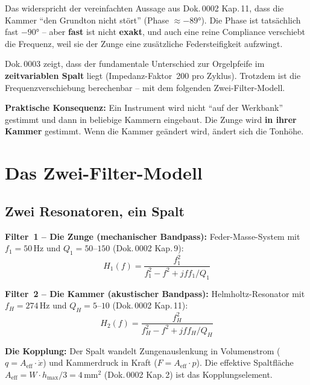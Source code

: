 \documentclass[11pt,a4paper]{article}
\begin{document}
Das widerspricht der vereinfachten Aussage aus Dok.\,0002 Kap.\,11, dass die Kammer ``den Grundton nicht stört'' (Phase $\approx -89$°). Die Phase ist tatsächlich fast $-90$° -- aber \textbf{fast} ist nicht \textbf{exakt}, und auch eine reine Compliance verschiebt die Frequenz, weil sie der Zunge eine zusätzliche Federsteifigkeit aufzwingt.

Dok.\,0003 zeigt, dass der fundamentale Unterschied zur Orgelpfeife im \textbf{zeitvariablen Spalt} liegt (Impedanz-Faktor~200 pro Zyklus). Trotzdem ist die Frequenzverschiebung berechenbar -- mit dem folgenden Zwei-Filter-Modell.

\begin{warnbox}
\textbf{Praktische Konsequenz:} Ein Instrument wird nicht ``auf der Werkbank'' gestimmt und dann in beliebige Kammern eingebaut. Die Zunge wird \textbf{in ihrer Kammer} gestimmt. Wenn die Kammer geändert wird, ändert sich die Tonhöhe.
\end{warnbox}

\section{Das Zwei-Filter-Modell}

\subsection{Zwei Resonatoren, ein Spalt}

\textbf{Filter~1 -- Die Zunge (mechanischer Bandpass):} Feder-Masse-System mit $f_1 = 50$\,Hz und $Q_1 = 50$--$150$ (Dok.\,0002 Kap.\,9):
\begin{equation}
H_1(f) = \frac{f_1^2}{f_1^2 - f^2 + j f f_1 / Q_1}
\end{equation}

\textbf{Filter~2 -- Die Kammer (akustischer Bandpass):} Helmholtz-Resonator mit $f_H = 274$\,Hz und $Q_H = 5$--$10$ (Dok.\,0002 Kap.\,11):
\begin{equation}
H_2(f) = \frac{f_H^2}{f_H^2 - f^2 + j f f_H / Q_H}
\end{equation}

\textbf{Die Kopplung:} Der Spalt wandelt Zungenauslenkung in Volumenstrom ($q = A_\text{eff} \cdot \dot{x}$) und Kammerdruck in Kraft ($F = A_\text{eff} \cdot p$). Die effektive Spaltfläche $A_\text{eff} = W \cdot h_\text{max}/3 = 4$\,mm$^2$ (Dok.\,0002 Kap.\,2) ist das Kopplungselement.
\end{document}
